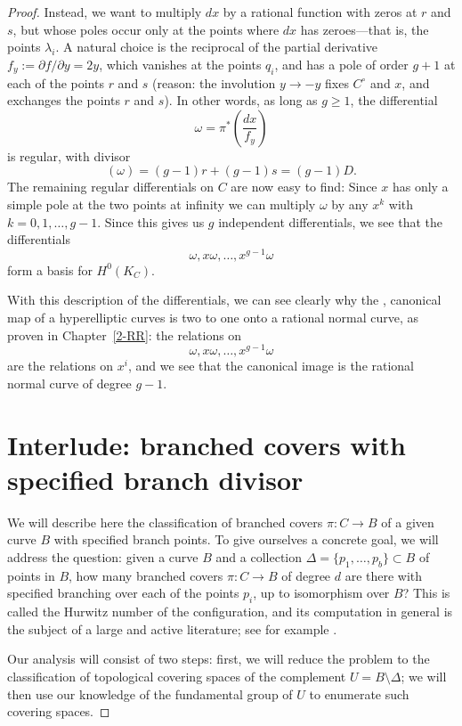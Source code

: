 \begin{proof}
Instead, we want to multiply $dx$ by a rational function with zeros at $r$ and $s$, but whose poles occur only at the points where $dx$ has zeroes---that is, the points $\lambda_i$.  A natural choice is the reciprocal of the partial derivative $f_y := \partial f/ \partial y = 2y$, which vanishes at the points $q_i$, and has  a pole of order $g+1$ at each of the points $r$ and $s$ (reason: the involution $y\to -y$ fixes $C^\circ$ and $x$, and exchanges the points $r$ and $s$). In other words, as long as $g \geq 1$, the differential
$$
\omega = \pi^*(\frac{dx}{f_y})
$$
is regular, with divisor
$$
(\omega) = (g-1)r + (g-1)s = (g-1)D.
$$
The remaining regular differentials on $C$ are now easy to find: Since $x$ has only a simple pole
at the two points at infinity we can  multiply $\omega$ by any $x^k$ with $k = 0, 1, \dots, g-1$. Since this gives us $g$ independent differentials, we see that the differentials
$$
\omega, x\omega, \dots, x^{g-1}\omega
$$
  form a basis for $H^0(K_C)$.

With this description of the differentials, we can see clearly why the , canonical map of a hyperelliptic curves is two to one onto a rational normal curve, as proven in Chapter~\ref{2-RR}:
the relations on 
$$
\omega, x\omega, \dots, x^{g-1}\omega
$$
are the relations on $x^i$, and we see that the canonical image is the rational normal curve of degree $g-1$.


\section{Interlude: branched covers with specified branch divisor}\label{branched covers}

We will describe here the classification of branched covers $\pi : C \to B$ of a given curve $B$ with specified branch points. To give ourselves a concrete goal, we will address the question: given a curve $B$ and a collection $\Delta = \{p_1,\dots,p_b\} \subset B$ of points in $B$, how many branched covers $\pi : C \to B$ of degree $d$ are there with specified branching over each of the points $p_i$, up to isomorphism over $B$? This is called
the Hurwitz number of the configuration, and its computation in general is the subject of a large and active literature; see for example
\cite{ELSV}.

Our analysis will consist of two steps: first, we will reduce the problem to the classification of topological covering spaces of the complement $U = B \setminus \Delta$; we will then use our knowledge of the fundamental group of $U$ to enumerate such covering spaces.
   

\end{proof}
